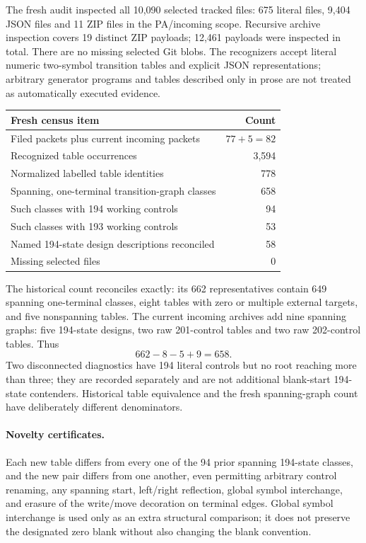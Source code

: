 The fresh audit inspected all 10,090 selected tracked files: 675 literal
 files, 9,404 JSON files and 11 ZIP files in the PA/incoming scope.
Recursive archive inspection covers 19 distinct ZIP payloads; 12,461
payloads were inspected in total. There are no missing selected Git blobs.
The recognizers accept literal numeric two-symbol transition tables and
explicit JSON representations; arbitrary generator programs and tables
described only in prose are not treated as automatically executed evidence.

\begin{center}\small
\begin{tabular}{@{}lr@{}}
\toprule Fresh census item & Count\\\midrule
Filed packets plus current incoming packets & $77+5=82$\\
Recognized table occurrences & 3,594\\
Normalized labelled table identities & 778\\
Spanning, one-terminal transition-graph classes & 658\\
Such classes with 194 working controls & 94\\
Such classes with 193 working controls & 53\\
Named 194-state design descriptions reconciled & 58\\
Missing selected files & 0\\
\bottomrule\end{tabular}
\end{center}

The historical count reconciles exactly: its 662 representatives contain
649 spanning one-terminal classes, eight tables with zero or multiple
external targets, and five nonspanning tables. The current incoming
archives add nine spanning graphs: five 194-state designs, two raw
201-control tables and two raw 202-control tables. Thus
\[
                         662-8-5+9=658.
\]
Two disconnected diagnostics have 194 literal controls but no root reaching
more than three; they are recorded separately and are not additional
blank-start 194-state contenders. Historical table equivalence and the
fresh spanning-graph count have deliberately different denominators.

\paragraph{Novelty certificates.}
Each new table differs from every one of the 94 prior spanning 194-state
classes, and the new pair differs from one another, even permitting
arbitrary control renaming, any spanning start, left/right reflection,
global symbol interchange, and erasure of the write/move decoration on
terminal edges. Global symbol interchange is used only as an extra
structural comparison; it does not preserve the designated zero blank
without also changing the blank convention.

